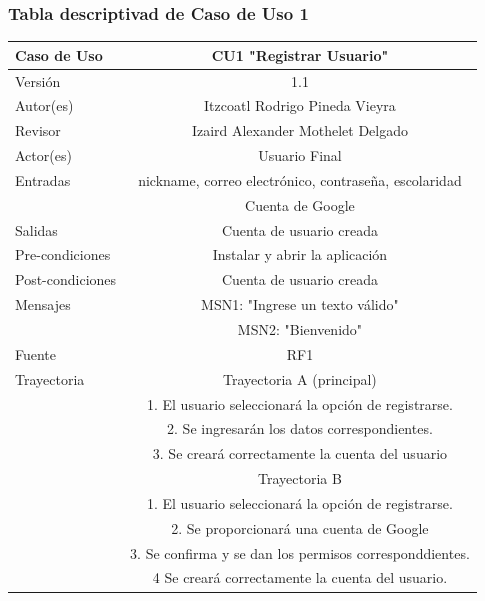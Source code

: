 \documentclass{article}
\begin{document}
\subsubsection{Tabla descriptivad de Caso de Uso 1}
\begin{tabular}{|M{5cm}|c|}
\hline
Caso de Uso & CU1 "Registrar Usuario"\\ \hline
Versión & 1.1\\ \hline
Autor(es) & Itzcoatl Rodrigo Pineda Vieyra\\ \hline
Revisor & Izaird Alexander Mothelet Delgado \\ \hline
Actor(es) & Usuario Final \\ \hline
Entradas & nickname, correo electrónico, contraseña, escolaridad\\ & Cuenta de Google \\ \hline
Salidas & Cuenta de usuario creada \\ \hline
Pre-condiciones & Instalar y abrir la aplicación \\ \hline
Post-condiciones & Cuenta de usuario creada\\ \hline
Mensajes & MSN1: "Ingrese un texto válido"\\
		 & MSN2: "Bienvenido"\\ \hline
Fuente & RF1 \\ \hline	
	Trayectoria & Trayectoria A (principal)\\
		& 1.   El usuario seleccionará la opción de registrarse.\\
		& 2.   Se ingresarán los datos correspondientes.\\
		& 3.   Se creará correctamente la cuenta del usuario\\
	& Trayectoria B\\
	& 1.   El usuario seleccionará la opción de registrarse.\\
	& 2.   Se proporcionará una cuenta de Google\\
	& 3.   Se confirma y se dan los permisos corresponddientes.\\
	& 4   Se creará correctamente la cuenta del usuario.\\ \hline
\end{tabular}
\end{document}
